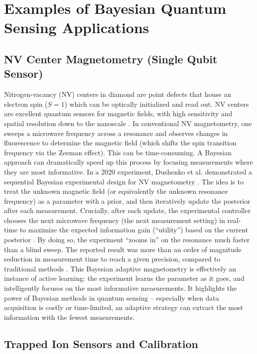 \section{Examples of Bayesian Quantum Sensing Applications}



\subsection{NV Center Magnetometry (Single Qubit Sensor)}

Nitrogen-vacancy (NV) centers in diamond are point defects that house
an electron spin ($S=1$) which can be optically initialized and read
out. NV centers are excellent quantum sensors for magnetic fields,
with high sensitivity and spatial resolution down to the nanoscale
. In conventional NV magnetometry, one sweeps a microwave frequency
across a resonance and observes changes in fluorescence to determine
the magnetic field (which shifts the spin transition frequency via the
Zeeman effect). This can be time-consuming. A Bayesian approach can
dramatically speed up this process by focusing measurements where they
are most informative. In a 2020 experiment, Dushenko et
al. demonstrated a sequential Bayesian experimental design for NV
magnetometry . The idea is to treat the unknown magnetic field (or
equivalently the unknown resonance frequency) as a parameter with a
prior, and then iteratively update the posterior after each
measurement. Crucially, after each update, the experimental controller
chooses the next microwave frequency (the next measurement setting) in
real-time to maximize the expected information gain (“utility”) based
on the current posterior . By doing so, the experiment “zooms in” on
the resonance much faster than a blind sweep. The reported result was
more than an order of magnitude reduction in measurement time to reach
a given precision, compared to traditional methods . This Bayesian
adaptive magnetometry is effectively an instance of active learning:
the experiment learns the parameter as it goes, and intelligently
focuses on the most informative measurements. It highlights the power
of Bayesian methods in quantum sensing – especially when data
acquisition is costly or time-limited, an adaptive strategy can
extract the most information with the fewest measurements.



\subsection{Trapped Ion Sensors and Calibration}

